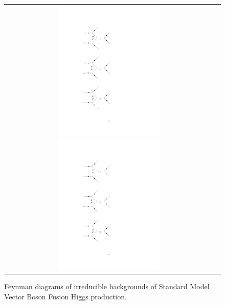\begin{figure}[tbh!]
	\centering
	\begin{tabular}{cc}
		\includegraphics[width=0.50\textwidth]{diagrams/pics/background_HZ0.pdf}
		\includegraphics[width=0.50\textwidth]{diagrams/pics/background_HW.pdf} 		
	\end{tabular}
	\caption{Feynman diagrams of irreducible backgrounds of Standard Model Vector Boson Fusion Higgs production. }
	\label{fig:background_SMVBFH}
\end{figure}

